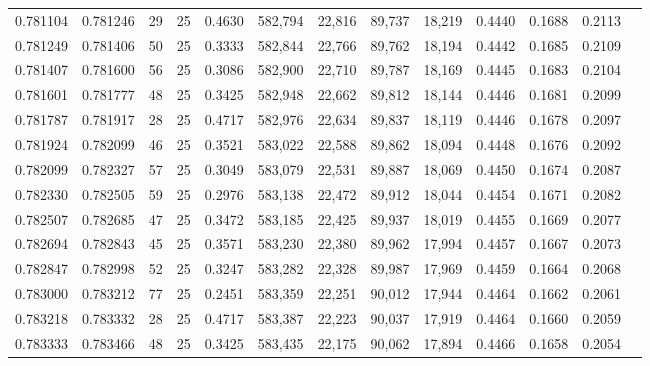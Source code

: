\begin{tabular}{rrrrrrrrrrrrr}
0.781104 & 0.781246 &    29 &  25 &                                     0.4630 & 582,794 &  22,816 &  89,737 &  18,219 & 0.4440 & 0.1688 & 0.2113 \\
0.781249 & 0.781406 &    50 &  25 &                                     0.3333 & 582,844 &  22,766 &  89,762 &  18,194 & 0.4442 & 0.1685 & 0.2109 \\
0.781407 & 0.781600 &    56 &  25 &                                     0.3086 & 582,900 &  22,710 &  89,787 &  18,169 & 0.4445 & 0.1683 & 0.2104 \\
0.781601 & 0.781777 &    48 &  25 &                                     0.3425 & 582,948 &  22,662 &  89,812 &  18,144 & 0.4446 & 0.1681 & 0.2099 \\
0.781787 & 0.781917 &    28 &  25 &                                     0.4717 & 582,976 &  22,634 &  89,837 &  18,119 & 0.4446 & 0.1678 & 0.2097 \\
0.781924 & 0.782099 &    46 &  25 &                                     0.3521 & 583,022 &  22,588 &  89,862 &  18,094 & 0.4448 & 0.1676 & 0.2092 \\
0.782099 & 0.782327 &    57 &  25 &                                     0.3049 & 583,079 &  22,531 &  89,887 &  18,069 & 0.4450 & 0.1674 & 0.2087 \\
0.782330 & 0.782505 &    59 &  25 &                                     0.2976 & 583,138 &  22,472 &  89,912 &  18,044 & 0.4454 & 0.1671 & 0.2082 \\
0.782507 & 0.782685 &    47 &  25 &                                     0.3472 & 583,185 &  22,425 &  89,937 &  18,019 & 0.4455 & 0.1669 & 0.2077 \\
0.782694 & 0.782843 &    45 &  25 &                                     0.3571 & 583,230 &  22,380 &  89,962 &  17,994 & 0.4457 & 0.1667 & 0.2073 \\
0.782847 & 0.782998 &    52 &  25 &                                     0.3247 & 583,282 &  22,328 &  89,987 &  17,969 & 0.4459 & 0.1664 & 0.2068 \\
0.783000 & 0.783212 &    77 &  25 &                                     0.2451 & 583,359 &  22,251 &  90,012 &  17,944 & 0.4464 & 0.1662 & 0.2061 \\
0.783218 & 0.783332 &    28 &  25 &                                     0.4717 & 583,387 &  22,223 &  90,037 &  17,919 & 0.4464 & 0.1660 & 0.2059 \\
0.783333 & 0.783466 &    48 &  25 &                                     0.3425 & 583,435 &  22,175 &  90,062 &  17,894 & 0.4466 & 0.1658 & 0.2054 \\

\end{tabular}
